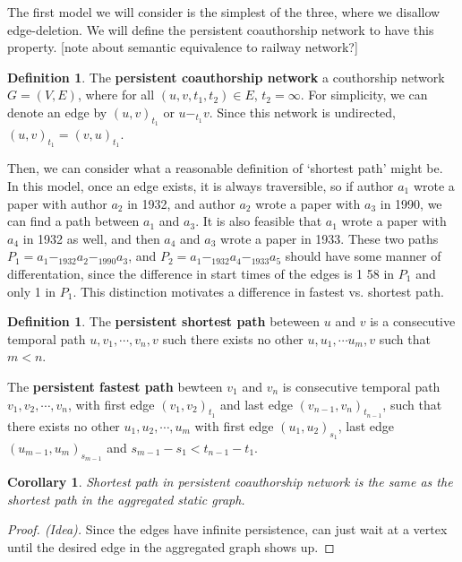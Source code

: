 \documentclass{article}
\newtheorem{cor}[thm]{Corollary}
\theoremstyle{definition}
\newtheorem{defn}[thm]{Definition}
\numberwithin{thm}{subsection}
\begin{document}
The first model we will consider is the simplest of the three, where we disallow
edge-deletion. We will define the persistent coauthorship network to have this
property. [note about semantic equivalence to railway network?]

\begin{defn}
  The \textbf{persistent coauthorship network} a couthorship network $G = (V,E)$,
  where for all $(u,v,t_1,t_2) \in E$, $t_2 = \infty$. For simplicity, we can
  denote an edge by $(u,v)_{t_1}$ or $u -_{t_1} v$. Since this network is
  undirected, $(u,v)_{t_1} = (v,u)_{t_1}$.
\end{defn}

Then, we can consider what a reasonable definition of `shortest path' might be.
In this model, once an edge exists, it is always traversible, so if author
$a_1$ wrote a paper with author $a_2$ in 1932, and author $a_2$ wrote a paper with
$a_3$ in 1990, we can find a path between $a_1$ and $a_3$.  It is also feasible
that $a_1$ wrote a paper with $a_4$ in 1932 as well, and then $a_4$ and $a_3$
wrote a paper in 1933. These two paths $P_1 = a_1 -_{1932} a_2 -_{1990} a_3$, and
$P_2 = a_1 -_{1932} a_4 -_{1933} a_5$ should have some manner of differentation,
since the difference in start times of the edges is 1 58 in $P_1$ and only 1
in $P_1$. This distinction motivates a difference in fastest vs. shortest path.


\begin{defn}
  The \textbf{persistent shortest path} beteween $u$ and $v$ is a consecutive
  temporal path $u,v_1,\cdots,v_n,v$ such there exists no other $u,u_1, \cdots u_m,v$ such that $m < n$.

  The \textbf{persistent fastest path} bewteen $v_1$ and $v_n$ is consecutive
  temporal path $v_1,v_2,\cdots,v_n$, with first edge $(v_1,v_2)_{t_1}$ and last
  edge $(v_{n-1},v_n)_{t_{n-1}}$, such that there exists no other
  $u_1,u_2, \cdots, u_m$ with first edge $(u_1,u_2)_{s_1}$, last edge
  $(u_{m-1},u_m)_{s_{m-1}}$ and $s_{m-1} - s_1 < t_{n-1} - t_{1}$.
\end{defn}


\begin{cor}
  Shortest path in persistent coauthorship network is the same as the shortest
  path in the aggregated static graph.
\end{cor}

\begin{proof}[Proof. (Idea)]
  Since the edges have infinite persistence, can just wait at a vertex until
  the desired edge in the aggregated graph shows up.
\end{proof}
\end{document}
